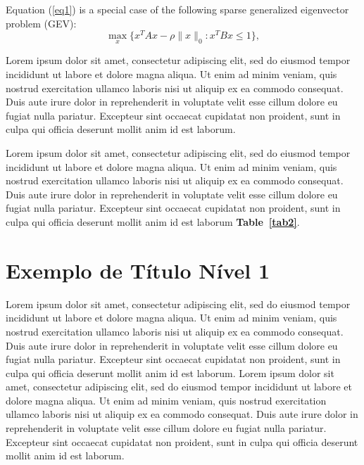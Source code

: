 \documentclass[spanish]{sbc2025}%
\begin{document}
Equation (\ref{eq1}) is a special case of the following sparse generalized eigenvector problem (GEV):
\begin{equation}\label{GEV}
\max\limits_{x}\{x^TAx-\rho \|x\|_0: x^TBx\leq 1\},
\end{equation}

Lorem ipsum dolor sit amet, consectetur adipiscing elit, sed do eiusmod tempor incididunt ut labore et dolore magna aliqua. Ut enim ad minim veniam, quis nostrud exercitation ullamco laboris nisi ut aliquip ex ea commodo consequat. Duis aute irure dolor in reprehenderit in voluptate velit esse cillum dolore eu fugiat nulla pariatur. Excepteur sint occaecat cupidatat non proident, sunt in culpa qui officia deserunt mollit anim id est laborum. 

Lorem ipsum dolor sit amet, consectetur adipiscing elit, sed do eiusmod tempor incididunt ut labore et dolore magna aliqua. Ut enim ad minim veniam, quis nostrud exercitation ullamco laboris nisi ut aliquip ex ea commodo consequat. Duis aute irure dolor in reprehenderit in voluptate velit esse cillum dolore eu fugiat nulla pariatur. Excepteur sint occaecat cupidatat non proident, sunt in culpa qui officia deserunt mollit anim id est laborum \textbf{Table~\ref{tab2}}.

\section{Exemplo de Título Nível 1}

Lorem ipsum dolor sit amet, consectetur adipiscing elit, sed do eiusmod tempor incididunt ut labore et dolore magna aliqua. Ut enim ad minim veniam, quis nostrud exercitation ullamco laboris nisi ut aliquip ex ea commodo consequat. Duis aute irure dolor in reprehenderit in voluptate velit esse cillum dolore eu fugiat nulla pariatur. Excepteur sint occaecat cupidatat non proident, sunt in culpa qui officia deserunt mollit anim id est laborum. Lorem ipsum dolor sit amet, consectetur adipiscing elit, sed do eiusmod tempor incididunt ut labore et dolore magna aliqua. Ut enim ad minim veniam, quis nostrud exercitation ullamco laboris nisi ut aliquip ex ea commodo consequat. Duis aute irure dolor in reprehenderit in voluptate velit esse cillum dolore eu fugiat nulla pariatur. Excepteur sint occaecat cupidatat non proident, sunt in culpa qui officia deserunt mollit anim id est laborum.
\end{document}
